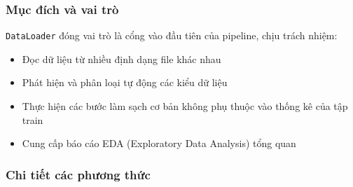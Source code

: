 \documentclass[12pt,a4paper]{article}
\begin{document}
\subsubsection{Mục đích và vai trò}

\texttt{DataLoader} đóng vai trò là cổng vào đầu tiên của pipeline, chịu trách nhiệm:
\begin{itemize}
    \item Đọc dữ liệu từ nhiều định dạng file khác nhau
    \item Phát hiện và phân loại tự động các kiểu dữ liệu
    \item Thực hiện các bước làm sạch cơ bản không phụ thuộc vào thống kê của tập train
    \item Cung cấp báo cáo EDA (Exploratory Data Analysis) tổng quan
\end{itemize}

\subsubsection{Chi tiết các phương thức}
\end{document}
